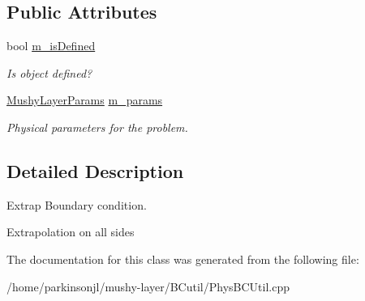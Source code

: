 \subsection*{Public Attributes}
\begin{DoxyCompactItemize}
\item 
\hypertarget{class_domain_extrap_b_c_function_adc313727aea12d585c4cda5752084a8a}{bool \hyperlink{class_domain_extrap_b_c_function_adc313727aea12d585c4cda5752084a8a}{m\-\_\-is\-Defined}}\label{class_domain_extrap_b_c_function_adc313727aea12d585c4cda5752084a8a}

\begin{DoxyCompactList}\small\item\em Is object defined? \end{DoxyCompactList}\item 
\hypertarget{class_domain_extrap_b_c_function_af988a9999fb0afb7f286c11ae85dc35c}{\hyperlink{class_mushy_layer_params}{Mushy\-Layer\-Params} \hyperlink{class_domain_extrap_b_c_function_af988a9999fb0afb7f286c11ae85dc35c}{m\-\_\-params}}\label{class_domain_extrap_b_c_function_af988a9999fb0afb7f286c11ae85dc35c}

\begin{DoxyCompactList}\small\item\em Physical parameters for the problem. \end{DoxyCompactList}\end{DoxyCompactItemize}


\subsection{Detailed Description}
Extrap Boundary condition. 

Extrapolation on all sides 

The documentation for this class was generated from the following file\-:\begin{DoxyCompactItemize}
\item 
/home/parkinsonjl/mushy-\/layer/\-B\-Cutil/Phys\-B\-C\-Util.\-cpp\end{DoxyCompactItemize}
